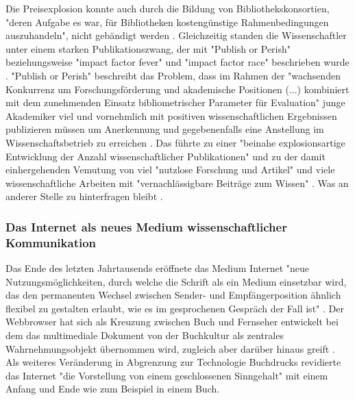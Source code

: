 Die Preisexplosion konnte auch durch die Bildung von Bibliothekskonsortien, "deren Aufgabe es war, für Bibliotheken kostengünstige Rahmenbedingungen auszuhandeln", nicht gebändigt werden \cite{Fladung_2003} \cite{Brintzinger_2010}. Gleichzeitig standen die Wissenschaftler unter einem starken Publikationszwang, der mit "Publish or Perish" \cite{CLAPHAM_2005} beziehungsweise "impact factor fever" \cite{Cherubini_2008} und "impact factor race" \cite{Brischoux_2009} beschrieben wurde \cite{offhaus_2012_institutionelle_repos}. "Publish or Perish" beschreibt das Problem, dass im Rahmen der "wachsenden Konkurrenz um Forschungsförderung und akademische Positionen (...) kombiniert mit dem zunehmenden Einsatz bibliometrischer Parameter für Evaluation" \cite{Fanelli_2010} junge Akademiker viel und vornehmlich mit positiven wissenschaftlichen Ergebnissen publizieren müssen um Anerkennung und gegebenenfalls eine Anstellung im Wissenschaftsbetrieb zu erreichen \cite{pscheida_2010_wikipedia} \cite{Beasley_2005} \cite{hamilton_1990_publishing}. Das führte zu einer "beinahe explosionsartige Entwicklung der Anzahl wissenschaftlicher Publikationen" \cite{bortz_Doering_2006_fragestellung} und zu der damit einhergehenden Vemutung von viel "nutzlose Forschung und Artikel"\cite{smith1990killing} und viele wissenschaftliche Arbeiten mit "vernachlässigbare Beiträge zum Wissen" \cite{hamilton_1990_publishing}. Was an anderer Stelle zu hinterfragen bleibt \cite{rekdal_2014_academic}.

\subsubsection{Das Internet als neues Medium wissenschaftlicher Kommunikation}

Das Ende des letzten Jahrtausends eröffnete das Medium Internet "neue Nutzungsmöglichkeiten, durch welche die Schrift als ein Medium einsetzbar wird, das den permanenten Wechsel zwischen Sender- und Empfängerposition ähnlich flexibel zu gestalten erlaubt, wie es im gesprochenen Gespräch der Fall ist" \cite{sandbothe_2000_pragmatische}. Der Webbrowser hat sich als Kreuzung zwischen Buch und Fernseher entwickelt bei dem das multimediale Dokument von der Buchkultur als zentrales Wahrnehmungsobjekt übernommen wird, zugleich aber darüber hinaus greift \cite{Warnke_2011}. Als weiteres Veränderung in Abgrenzung zur Technologie Buchdrucks revidierte das Internet "die Vorstellung von einem geschlossenen Sinngehalt" \cite{sandbothe_2000_pragmatische} mit einem Anfang und Ende wie zum Beispiel in einem Buch.

